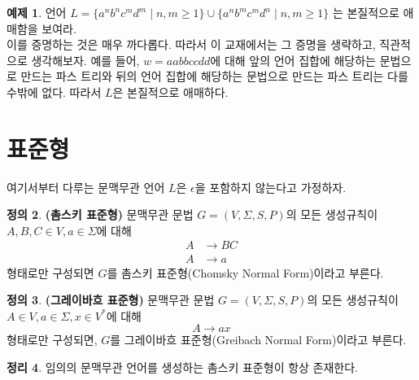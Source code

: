 \documentclass[b5paper, 10pt]{book}
\theoremstyle{definition}
\newtheorem{defn}{정의}[chapter]
\newtheorem{thm}[defn]{정리}
\newtheorem{ex}[defn]{예제}
\begin{document}
\begin{ex}
    언어 $L = \{a^nb^nc^md^m \; \vert \; n,m \ge 1\} \cup \{a^nb^mc^md^n \; \vert \; n,m \ge 1\}$
    는 본질적으로 애매함을 보여라. \\ 
     이를 증명하는 것은 매우 까다롭다. 따라서 이 교재에서는 그 증명을 생략하고, 직관적으로 생각해보자.
    예를 들어, $w = aabbccdd$에 대해 앞의 언어 집합에 해당하는 문법으로 만드는 파스 트리와
    뒤의 언어 집합에 해당하는 문법으로 만드는 파스 트리는 다를 수밖에 없다. 
    따라서 $L$은 본질적으로 애매하다.
\end{ex}
\section{표준형}
여기서부터 다루는 문맥무관 언어 $L$은 $\epsilon$을 포함하지 않는다고 가정하자. 
\begin{defn}
    \textbf{(촘스키 표준형)} 문맥무관 문법 $G = (V, \Sigma, S, P)$의 모든
    생성규칙이 $A, B, C \in V, a \in \Sigma$에 대해 
    \begin{align*}
        A &\rightarrow BC \\ 
        A &\rightarrow a 
    \end{align*}
    형태로만 구성되면 $G$를 촘스키 표준형(Chomsky Normal Form)이라고 부른다. 
\end{defn}
\begin{defn}
    \textbf{(그레이바흐 표준형)} 문맥무관 문법 $G = (V, \Sigma, S,P)$의 모든
    생성규칙이 $A\in V, a\in\Sigma , x \in V^*$에 대해
    $$A \rightarrow ax$$
    형태로만 구성되면, $G$를 그레이바흐 표준형(Greibach Normal Form)이라고 부른다.
\end{defn}
\begin{thm}
    임의의 문맥무관 언어를 생성하는 촘스키 표준형이 항상 존재한다. 
\end{thm}
\end{document}

